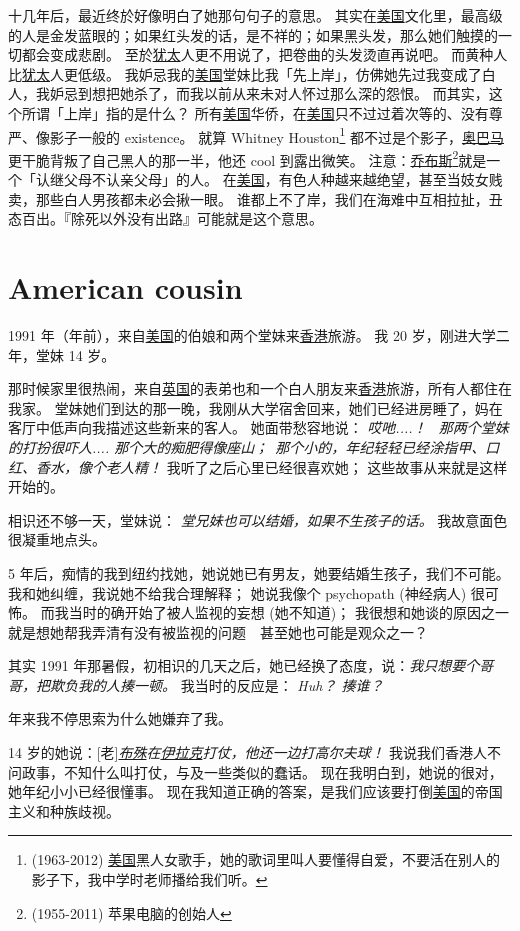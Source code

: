 \documentclass[12pt]{report}
\newcommand{\speechCn}[1]{\textrm{\textit{\textcolor{Speech}{#1}}}}
\newcommand*\dashh{\,\,\textemdash\kern-1pt\textemdash\,\,}
\begin{document}
十几年后，最近终於好像明白了她那句句子的意思。 其实在\uline{美国}文化里，最高级的人是金发蓝眼的；如果红头发的话，是不祥的；如果黑头发，那么她们触摸的一切都会变成悲剧。 至於\uline{犹太}人更不用说了，把卷曲的头发烫直再说吧。 而黄种人比\uline{犹太}人更低级。 我妒忌我的\uline{美国}堂妹比我「先上岸」，仿佛她先过我变成了白人，我妒忌到想把她杀了，而我以前从来未对人怀过那么深的怨恨。 而其实，这个所谓「上岸」指的是什么？ 所有\uline{美国}华侨，在\uline{美国}只不过过着次等的、没有尊严、像影子一般的 existence。 就算 Whitney Houston\footnote{(1963-2012) \uline{美国}黑人女歌手，她的歌词里叫人要懂得自爱，不要活在别人的影子下，我中学时老师播给我们听。} 都不过是个影子，\uline{奥巴马}更干脆背叛了自己黑人的那一半，他还 cool 到露出微笑。  注意：\uline{乔布斯}\footnote{(1955-2011) 苹果电脑的创始人}就是一个「认继父母不认亲父母」的人。 在\uline{美国}，有色人种越来越绝望，甚至当妓女贱卖，那些白人男孩都未必会揪一眼。 谁都上不了岸，我们在海难中互相拉扯，丑态百出。『除死以外没有出路』可能就是这个意思。

\chapter{American cousin}

1991 年（\resultb 年前），来自\uline{美国}的伯娘和两个堂妹来\uline{香港}旅游。 我 20 岁，刚进大学二年，堂妹 14 岁。

那时候家里很热闹，来自\uline{英国}的表弟也和一个白人朋友来\uline{香港}旅游，所有人都住在我家。  堂妹她们到达的那一晚，我刚从大学宿舍回来，她们已经进房睡了，妈在客厅中低声向我描述这些新来的客人。    她面带愁容地说： \speechCn{哎吔....！ \ 那两个堂妹的打扮很吓人.... 那个大的痴肥得像座山；\  那个小的，年纪轻轻已经涂指甲、口红、香水，像个老人精！}   我听了之后心里已经很喜欢她； 这些故事从来就是这样开始的。

相识还不够一天，堂妹说： \speechCn{堂兄妹也可以结婚，如果不生孩子的话。} 我故意面色很凝重地点头。

5 年后，痴情的我到纽约找她，她说她已有男友，她要结婚生孩子，我们不可能。 我和她纠缠，我说她不给我合理解释； 她说我像个 psychopath (神经病人) 很可怖。 而我当时的确开始了被人监视的妄想 (她不知道)； 我很想和她谈的原因之一就是想她帮我弄清有没有被监视的问题 \dashh 甚至她也可能是观众之一？

其实 1991 年那暑假，初相识的几天之后，她已经换了态度，说：\speechCn{我只想要个哥哥，把欺负我的人揍一顿。} 我当时的反应是： \speechCn{Huh？ 揍谁？}

\resultb 年来我不停思索为什么她嫌弃了我。

14 岁的她说：[老]\speechCn{\uline{布殊}在\uline{伊拉克}打仗，他还一边打高尔夫球！} 我说我们香港人不问政事，不知什么叫打仗，与及一些类似的蠢话。  现在我明白到，她说的很对，她年纪小小已经很懂事。  现在我知道正确的答案，是我们应该要打倒\uline{美国}的帝国主义和种族歧视。
\end{document}
